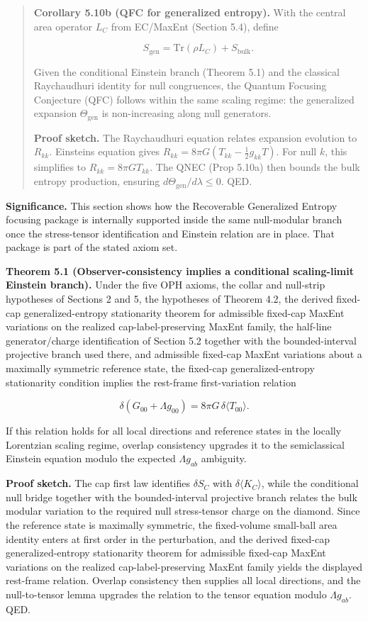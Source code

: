 \begin{quote}
\textbf{Corollary 5.10b (QFC for generalized entropy).} With the central area operator \(L_C\) from EC/MaxEnt (Section 5.4), define

\[
S_{\mathrm{gen}} = \mathrm{Tr}(\rho L_C) + S_{\mathrm{bulk}}.
\]

Given the conditional Einstein branch (Theorem 5.1) and the classical Raychaudhuri identity for null congruences, the Quantum Focusing Conjecture (QFC) follows within the same scaling regime: the generalized expansion \(\Theta_{\mathrm{gen}}\) is non-increasing along null generators.

\textbf{Proof sketch.} The Raychaudhuri equation relates expansion evolution to \(R_{kk}\). Einstein\textquotesingle s equation gives \(R_{kk} = 8\pi G (T_{kk} - \frac{1}{2}g_{kk}T)\). For null \(k\), this simplifies to \(R_{kk} = 8\pi G T_{kk}\). The QNEC (Prop 5.10a) then bounds the bulk entropy production, ensuring \(d\Theta_{\mathrm{gen}}/d\lambda \le 0\). QED.
\end{quote}

\textbf{Significance.} This section shows how the Recoverable Generalized Entropy focusing package is internally supported inside the same null-modular branch once the stress-tensor identification and Einstein relation are in place. That package is part of the stated axiom set.

\textbf{Theorem 5.1 (Observer-consistency implies a conditional scaling-limit Einstein branch).} Under the five OPH axioms, the collar and null-strip hypotheses of Sections 2 and 5, the hypotheses of Theorem 4.2, the derived fixed-cap generalized-entropy stationarity theorem for admissible fixed-cap MaxEnt variations on the realized cap-label-preserving MaxEnt family, the half-line generator/charge identification of Section 5.2 together with the bounded-interval projective branch used there, and admissible fixed-cap MaxEnt variations about a maximally symmetric reference state, the fixed-cap generalized-entropy stationarity condition implies the rest-frame first-variation relation

\[
\delta\!\left(G_{00}+\Lambda g_{00}\right)=8\pi G\,\delta\langle T_{00}\rangle.
\]

If this relation holds for all local directions and reference states in the locally Lorentzian scaling regime, overlap consistency upgrades it to the semiclassical Einstein equation modulo the expected \(\Lambda g_{ab}\) ambiguity.

\textbf{Proof sketch.} The cap first law identifies \(\delta S_C\) with \(\delta\langle K_C\rangle\), while the conditional null bridge together with the bounded-interval projective branch relates the bulk modular variation to the required null stress-tensor charge on the diamond. Since the reference state is maximally symmetric, the fixed-volume small-ball area identity enters at first order in the perturbation, and the derived fixed-cap generalized-entropy stationarity theorem for admissible fixed-cap MaxEnt variations on the realized cap-label-preserving MaxEnt family yields the displayed rest-frame relation. Overlap consistency then supplies all local directions, and the null-to-tensor lemma upgrades the relation to the tensor equation modulo \(\Lambda g_{ab}\). QED.

